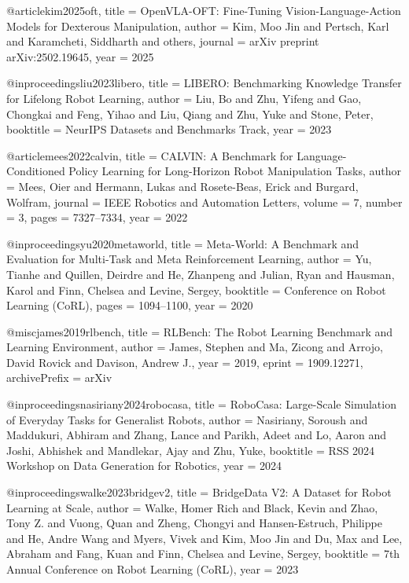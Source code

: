 @article{kim2025oft,
  title   = {{OpenVLA-OFT}: Fine-Tuning Vision-Language-Action Models for
             Dexterous Manipulation},
  author  = {Kim, Moo Jin and Pertsch, Karl and Karamcheti, Siddharth and others},
  journal = {arXiv preprint arXiv:2502.19645},
  year    = {2025}
}


@inproceedings{liu2023libero,
  title     = {{LIBERO}: Benchmarking Knowledge Transfer for Lifelong Robot Learning},
  author    = {Liu, Bo and Zhu, Yifeng and Gao, Chongkai and Feng, Yihao
               and Liu, Qiang and Zhu, Yuke and Stone, Peter},
  booktitle = {NeurIPS Datasets and Benchmarks Track},
  year      = {2023}
}

@article{mees2022calvin,
  title   = {{CALVIN}: A Benchmark for Language-Conditioned Policy Learning for
             Long-Horizon Robot Manipulation Tasks},
  author  = {Mees, Oier and Hermann, Lukas and Rosete-Beas, Erick and Burgard, Wolfram},
  journal = {IEEE Robotics and Automation Letters},
  volume  = {7},
  number  = {3},
  pages   = {7327--7334},
  year    = {2022}
}

@inproceedings{yu2020metaworld,
  title     = {{Meta-World}: A Benchmark and Evaluation for Multi-Task and
               Meta Reinforcement Learning},
  author    = {Yu, Tianhe and Quillen, Deirdre and He, Zhanpeng and Julian, Ryan
               and Hausman, Karol and Finn, Chelsea and Levine, Sergey},
  booktitle = {Conference on Robot Learning (CoRL)},
  pages     = {1094--1100},
  year      = {2020}
}

@misc{james2019rlbench,
  title         = {{RLBench}: The Robot Learning Benchmark and Learning Environment},
  author        = {James, Stephen and Ma, Zicong and Arrojo, David Rovick
                   and Davison, Andrew J.},
  year          = {2019},
  eprint        = {1909.12271},
  archivePrefix = {arXiv}
}

@inproceedings{nasiriany2024robocasa,
  title     = {{RoboCasa}: Large-Scale Simulation of Everyday Tasks for Generalist Robots},
  author    = {Nasiriany, Soroush and Maddukuri, Abhiram and Zhang, Lance
               and Parikh, Adeet and Lo, Aaron and Joshi, Abhishek
               and Mandlekar, Ajay and Zhu, Yuke},
  booktitle = {RSS 2024 Workshop on Data Generation for Robotics},
  year      = {2024}
}

@inproceedings{walke2023bridgev2,
  title     = {{BridgeData V2}: A Dataset for Robot Learning at Scale},
  author    = {Walke, Homer Rich and Black, Kevin and Zhao, Tony Z. and Vuong, Quan
               and Zheng, Chongyi and Hansen-Estruch, Philippe and He, Andre Wang
               and Myers, Vivek and Kim, Moo Jin and Du, Max and Lee, Abraham
               and Fang, Kuan and Finn, Chelsea and Levine, Sergey},
  booktitle = {7th Annual Conference on Robot Learning (CoRL)},
  year      = {2023}
}

